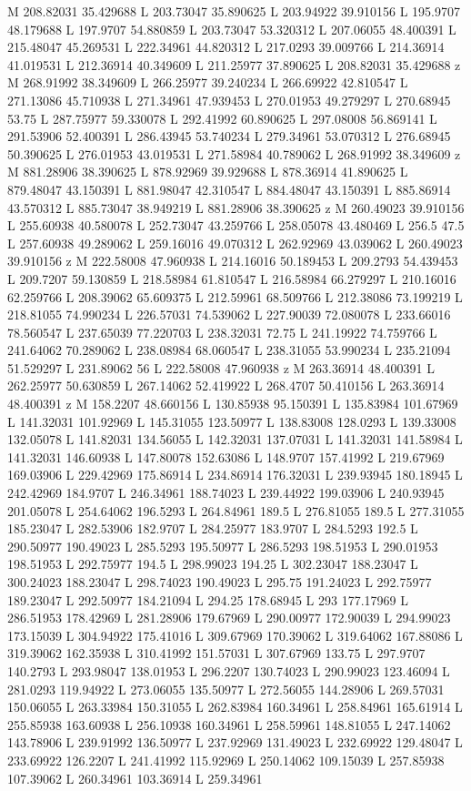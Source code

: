 {\begin{scope}[local bounding box=bb]
{M 208.82031 35.429688 L 203.73047 35.890625 L 203.94922 39.910156 L 195.9707 48.179688 L 197.9707 54.880859 L 203.73047 53.320312 L 207.06055 48.400391 L 215.48047 45.269531 L 222.34961 44.820312 L 217.0293 39.009766 L 214.36914 41.019531 L 212.36914 40.349609 L 211.25977 37.890625 L 208.82031 35.429688 z M 268.91992 38.349609 L 266.25977 39.240234 L 266.69922 42.810547 L 271.13086 45.710938 L 271.34961 47.939453 L 270.01953 49.279297 L 270.68945 53.75 L 287.75977 59.330078 L 292.41992 60.890625 L 297.08008 56.869141 L 291.53906 52.400391 L 286.43945 53.740234 L 279.34961 53.070312 L 276.68945 50.390625 L 276.01953 43.019531 L 271.58984 40.789062 L 268.91992 38.349609 z M 881.28906 38.390625 L 878.92969 39.929688 L 878.36914 41.890625 L 879.48047 43.150391 L 881.98047 42.310547 L 884.48047 43.150391 L 885.86914 43.570312 L 885.73047 38.949219 L 881.28906 38.390625 z M 260.49023 39.910156 L 255.60938 40.580078 L 252.73047 43.259766 L 258.05078 43.480469 L 256.5 47.5 L 257.60938 49.289062 L 259.16016 49.070312 L 262.92969 43.039062 L 260.49023 39.910156 z M 222.58008 47.960938 L 214.16016 50.189453 L 209.2793 54.439453 L 209.7207 59.130859 L 218.58984 61.810547 L 216.58984 66.279297 L 210.16016 62.259766 L 208.39062 65.609375 L 212.59961 68.509766 L 212.38086 73.199219 L 218.81055 74.990234 L 226.57031 74.539062 L 227.90039 72.080078 L 233.66016 78.560547 L 237.65039 77.220703 L 238.32031 72.75 L 241.19922 74.759766 L 241.64062 70.289062 L 238.08984 68.060547 L 238.31055 53.990234 L 235.21094 51.529297 L 231.89062 56 L 222.58008 47.960938 z M 263.36914 48.400391 L 262.25977 50.630859 L 267.14062 52.419922 L 268.4707 50.410156 L 263.36914 48.400391 z M 158.2207 48.660156 L 130.85938 95.150391 L 135.83984 101.67969 L 141.32031 101.92969 L 145.31055 123.50977 L 138.83008 128.0293 L 139.33008 132.05078 L 141.82031 134.56055 L 142.32031 137.07031 L 141.32031 141.58984 L 141.32031 146.60938 L 147.80078 152.63086 L 148.9707 157.41992 L 219.67969 169.03906 L 229.42969 175.86914 L 234.86914 176.32031 L 239.93945 180.18945 L 242.42969 184.9707 L 246.34961 188.74023 L 239.44922 199.03906 L 240.93945 201.05078 L 254.64062 196.5293 L 264.84961 189.5 L 276.81055 189.5 L 277.31055 185.23047 L 282.53906 182.9707 L 284.25977 183.9707 L 284.5293 192.5 L 290.50977 190.49023 L 285.5293 195.50977 L 286.5293 198.51953 L 290.01953 198.51953 L 292.75977 194.5 L 298.99023 194.25 L 302.23047 188.23047 L 300.24023 188.23047 L 298.74023 190.49023 L 295.75 191.24023 L 292.75977 189.23047 L 292.50977 184.21094 L 294.25 178.68945 L 293 177.17969 L 286.51953 178.42969 L 281.28906 179.67969 L 290.00977 172.90039 L 294.99023 173.15039 L 304.94922 175.41016 L 309.67969 170.39062 L 319.64062 167.88086 L 319.39062 162.35938 L 310.41992 151.57031 L 307.67969 133.75 L 297.9707 140.2793 L 293.98047 138.01953 L 296.2207 130.74023 L 290.99023 123.46094 L 281.0293 119.94922 L 273.06055 135.50977 L 272.56055 144.28906 L 269.57031 150.06055 L 263.33984 150.31055 L 262.83984 160.34961 L 258.84961 165.61914 L 255.85938 163.60938 L 256.10938 160.34961 L 258.59961 148.81055 L 247.14062 143.78906 L 239.91992 136.50977 L 237.92969 131.49023 L 232.69922 129.48047 L 233.69922 126.2207 L 241.41992 115.92969 L 250.14062 109.15039 L 257.85938 107.39062 L 260.34961 103.36914 L 259.34961 }
\end{scope}}
